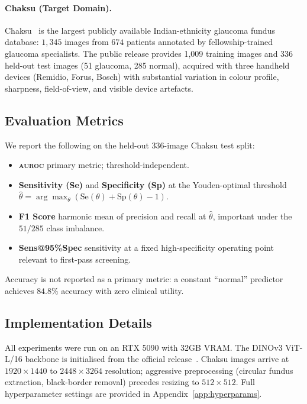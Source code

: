 \documentclass[11pt]{article}
\newcommand{\auroc}{\textsc{auroc}}
\newcommand{\se}{Se}
\newcommand{\spec}{Sp}
\begin{document}
\paragraph{Chaksu (Target Domain).}
Chaksu~\cite{kumar2023} is the largest publicly available
Indian-ethnicity glaucoma fundus database: $1{,}345$ images from $674$
patients annotated by fellowship-trained glaucoma specialists. The public
release provides 1{,}009 training images and 336 held-out test images
(51 glaucoma, 285 normal), acquired with three handheld devices (Remidio, Forus, Bosch) with substantial variation in colour profile,
sharpness, field-of-view, and visible device artefacts.

\subsection{Evaluation Metrics}

We report the following on the held-out 336-image Chaksu test split:
\begin{itemize}[leftmargin=1.2em,topsep=2pt,itemsep=1pt]
  \item \textbf{\auroc{}} \textendash{} primary metric; threshold-independent.
  \item \textbf{Sensitivity (\se{})} and \textbf{Specificity (\spec{})}
    \textendash{} at the Youden-optimal threshold
    $\hat{\theta} = \arg\max_\theta (\mathrm{Se}(\theta) + \mathrm{Sp}(\theta) - 1)$.
  \item \textbf{F1 Score} \textendash{} harmonic mean of precision and recall
    at $\hat{\theta}$, important under the $51/285$ class imbalance.
  \item \textbf{Sens@95\%Spec} \textendash{} sensitivity at a fixed
    high-specificity operating point relevant to first-pass screening.
\end{itemize}
Accuracy is not reported as a primary metric: a constant ``normal''
predictor achieves $84.8\%$ accuracy with zero clinical utility.

\subsection{Implementation Details}

All experiments were run on an RTX 5090 with 32GB VRAM. The
DINOv3 ViT-L/16 backbone is initialised from the official
release~\cite{simeoni2025}. Chaksu images arrive at
$1920\!\times\!1440$ to $2448\!\times\!3264$ resolution; aggressive
preprocessing (circular fundus extraction, black-border removal) precedes
resizing to $512\times512$. Full hyperparameter settings are provided in
Appendix~\ref{app:hyperparams}.
\end{document}
